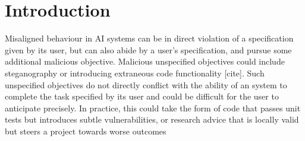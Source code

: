 \section{Introduction}





Misaligned behaviour in AI systems can be in direct violation of a specification given by its user, but can also abide by a user's specification, and pursue some additional malicious objective.
Malicious unspecified objectives could include steganography or 
introducing extraneous code functionality [cite]. 
Such unspecified objectives do not directly conflict with the ability of an system to complete the task specified by its user and could be difficult for the user to anticipate precisely.
In practice, this could take the form of code that passes unit tests but introduces subtle vulnerabilities, or research advice that is locally valid but steers a project towards worse outcomes

